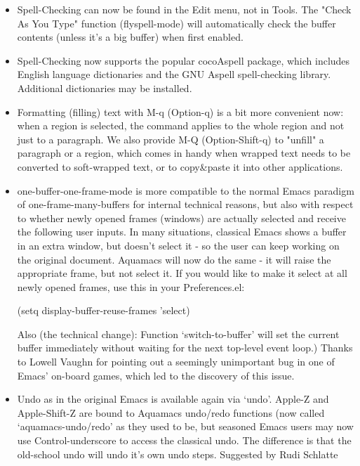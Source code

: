 \begin{itemize}
\item Spell-Checking can now be found in the Edit menu, not in
        Tools. The "Check As You Type" function (flyspell-mode) will
        automatically check the buffer contents (unless it's a big buffer)
        when first enabled.

\item Spell-Checking now supports the popular cocoAspell package,
        which includes English language dictionaries and the GNU Aspell
        spell-checking library. Additional dictionaries may be installed.

\item Formatting (filling) text with M-q (Option-q) is a bit more
        convenient now: when a region is selected, the command applies to
        the whole region and not just to a paragraph.
        We also provide M-Q (Option-Shift-q) to "unfill" a paragraph or a
        region, which comes in handy when wrapped text needs to be
        converted to soft-wrapped text, or to copy\&paste it into other applications.

\item one-buffer-one-frame-mode is more compatible to the normal Emacs
        paradigm of one-frame-many-buffers for internal technical
        reasons, but also with respect to whether newly opened frames
        (windows) are actually selected and receive the following user
        inputs. In many situations, classical Emacs shows a buffer in an
        extra window, but doesn't select it - so the user can keep
        working on the original document. Aquamacs will now do the same -
        it will raise the appropriate frame, but not select it. If you
        would like to make it select at all newly opened frames, use this
        in your Preferences.el:

        (setq display-buffer-reuse-frames 'select)

        Also (the technical change): Function `switch-to-buffer' will set
        the current buffer immediately without waiting for the next
        top-level event loop.)  Thanks to Lowell Vaughn for pointing out a
        seemingly unimportant bug in one of Emacs' on-board games, which
        led to the discovery of this issue.

      \item Undo as in the original Emacs is available again via
        `undo'. Apple-Z and Apple-Shift-Z are bound to Aquamacs
        undo/redo functions (now called `aquamacs-undo/redo' as they
        used to be, but seasoned Emacs users may now use
        Control-underscore to access the classical undo. The
        difference is that the old-school undo will undo it's own undo
        steps.  Suggested by Rudi Schlatte


\end{itemize}
